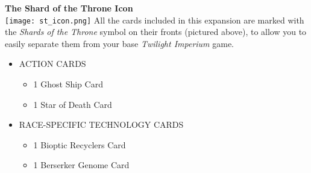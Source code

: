 \documentclass[11pt,fleqn]{book} %
\begin{document}
\begin{STbox}
\textbf{The Shard of the Throne Icon }\\
\texttt{[image: st\_icon.png]}
All the cards included in this expansion are marked with the \emph{Shards of the Throne} symbol on their fronts (pictured above), to allow you to easily separate them from your base \emph{Twilight Imperium} game.

\begin{itemize}
\item ACTION CARDS
\begin{itemize}
\item 1 Ghost Ship Card
\item 1 Star of Death Card
\end{itemize}
\item RACE-SPECIFIC TECHNOLOGY CARDS
\begin{itemize}
\item 1 Bioptic Recyclers Card
\item 1 Berserker Genome Card
\end{itemize}
\end{itemize}

\end{STbox}



\end{document}
